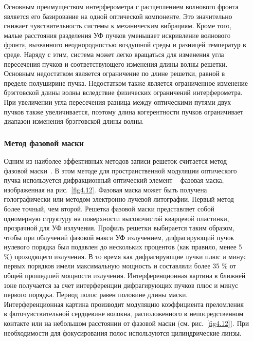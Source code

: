 Основным преимуществом интерферометра с расщеплением волнового фронта является его базирование на одной оптической компоненте. Это значительно снижает чувствительность системы к механическим вибрациям. Кроме того, малые расстояния разделения УФ пучков уменьшает искривление волнового фронта, вызванного неоднородностью воздушной среды и разницей температур в среде. Наряду с этим, система может легко вращаться для изменения угла пересечения пучков и соответствующего изменения длины волны решетки. Основным недостатком является ограничение по длине решетки, равной в пределе полуширине пучка. Недостатком также является ограниченное изменение брэгговской длины волны вследствие физических ограничений интерферометра. При увеличении угла пересечения разница между оптическими путями двух пучков также увеличивается, поэтому длина когерентности пучков ограничивает диапазон изменения брэгговской длины волны.


\subsubsection{Метод фазовой маски}

Одним из наиболее эффективных методов записи решеток считается метод фазовой маски~\cite{Hill93}. В этом методе для пространственной модуляции оптического пучка используется дифракционный оптический элемент – фазовая маска, изображенная на рис.~\ref{fig4.12}. Фазовая маска может быть получена голографически или методом электронно-лучевой литографии. Первый метод более точный, чем второй. Решетка фазовой маски представляет собой одномерную структуру на поверхности высокочистой кварцевой пластинки, прозрачной для УФ излучения. Профиль решетки выбирается таким образом, чтобы при облучений фазовой макси УФ излучением, дифрагирующий пучок нулевого порядка был подавлен до нескольких процентов (как правило, менее 5 \%) проходящего излучения. В то время как дифрагирующие пучки плюс и минус первых порядков имели максимальную мощность и составляли более 35 \% от общей прошедшей мощности излучения. Интерференционная картина в ближней зоне получается за счет интерференции дифрагирующих пучков плюс и минус первого порядка. Период полос равен половине длины маски. Интерференционная картина производит модуляцию коэффициента преломления в фоточувствительной сердцевине волокна, расположенного в непосредственном контакте или на небольшом расстоянии от фазовой маски (см. рис.~\ref{fig4.12}). При необходимости для фокусирования полос используются цилиндрические линзы.

